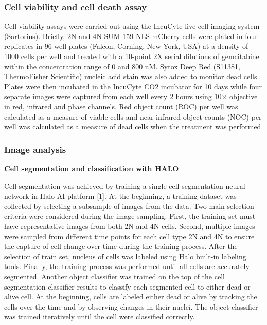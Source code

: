 \documentclass[11pt,notitlepage]{article}
\begin{document}




\subsubsection*{Cell viability and cell death assay}
Cell viability assays were carried out using the IncuCyte live-cell imaging system (Sartorius). Briefly, 2N and 4N SUM-159-NLS-mCherry cells were plated in four replicates in 96-well plates (Falcon, Corning, New York, USA) at a density of 1000 cells per well and treated with a 10-point 2X serial dilutions of gemcitabine within the concentration range of 0 and 800 nM. Sytox Deep Red (S11381, ThermoFisher Scientific) nucleic acid stain was also added to monitor dead cells. Plates were then incubated in the IncuCyte CO2 incubator for 10 days while four separate images were captured from each well every 2 hours using 10× objective in red, infrared and phase channels. Red object count (ROC) per well was calculated as a measure of viable cells and near-infrared object counts (NOC) per well was calculated as a measure of dead cells when the treatment was performed.

\subsubsection*{Image analysis}
 \textbf{Cell segmentation and classification with HALO}

Cell segmentation was achieved by training a single-cell segmentation neural network in Halo-AI platform [1]. At the beginning, a training dataset was collected by selecting a subsample of images from the data. Two main selection criteria were considered during the image sampling. First, the training set must have representative images from both 2N and 4N cells. Second, multiple images were sampled from different time points for each cell type 2N and 4N to ensure the capture of cell change over time during the training process. After the selection of train set, nucleus of cells was labeled using Halo built-in labeling tools. Finally, the training process was performed until all cells are accurately segmented. 
Another object classifier was trained on the top of the cell segmentation classifier results to classify each segmented cell to either dead or alive cell. At the beginning, cells are labeled either dead or alive by tracking the cells over the time and by observing changes in their nuclei. The object classifier was trained iteratively until the cell were classified correctly.
\end{document}
